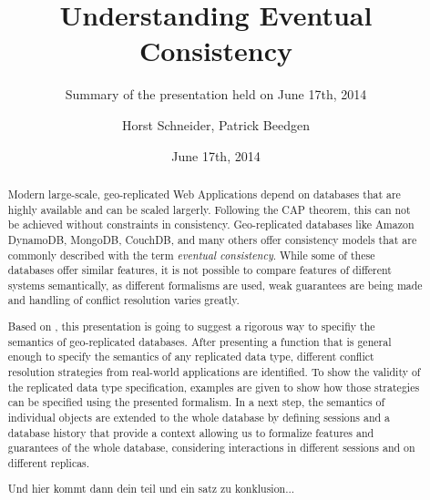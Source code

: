 \documentclass{scrartcl}
\title{Understanding Eventual Consistency}
\subtitle{Summary of the presentation held on June 17th, 2014}
\author{Horst Schneider, Patrick Beedgen}
\date{June 17th, 2014}
\begin{document}
 
\maketitle

\begin{abstract}
Modern large-scale, geo-replicated Web Applications depend on databases that are highly available and can be scaled largerly. Following the CAP theorem, this can not be achieved without constraints in consistency. Geo-replicated databases like Amazon DynamoDB, MongoDB, CouchDB, and many others offer consistency models that are commonly described with the term \textit{eventual consistency}. While some of these databases offer similar features, it is not possible to compare features of different systems semantically, as different formalisms are used, weak guarantees are being made and handling of conflict resolution varies greatly. 

Based on \citep{burckhardt2013}, this presentation is going to suggest a rigorous way to specifiy the semantics of geo-replicated databases. 
After presenting a function that is general enough to specify the semantics of any replicated data type, different conflict resolution strategies from real-world applications are identified. To show the validity of the replicated data type specification, examples are given to show how those strategies can be specified using the presented formalism. 
In a next step, the semantics of individual objects are extended to the whole database by defining sessions and a database history that provide a context allowing us to formalize features and guarantees of the whole database, considering interactions in different sessions and on different replicas.

Und hier kommt dann dein teil und ein satz zu konklusion...

\end{abstract}

\pagebreak


\nocite{*}

\end{document}
